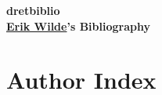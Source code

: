 \documentclass[10pt]{article}
\def\doctitle{dretbiblio}
\def\docauthor{Erik Wilde}
\begin{document}
\begin{centering}
\vspace*{7mm}
{\huge\bf\doctitle}\\
\vspace*{7mm}
{\large\bf \href{http://dret.net/netdret/}{\docauthor}'s Bibliography}\\
\vspace*{10mm}
\end{centering}

\nocite{*}

\def\authorstyle#1{{\sc #1}}




\renewcommand{\aipages}[1]{[{#1}]}
\section*{Author Index}

\begin{multicols}{2}
\printauthorindex
\end{multicols}
\end{document}
